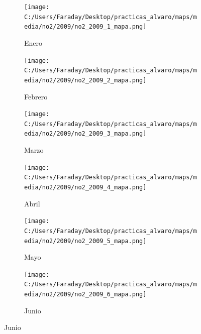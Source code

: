 \documentclass[12pt]{article}
\begin{document}
\begin{figure}[H]
\centering
\begin{subfigure}[H]{0.15\textwidth}
\texttt{[image: C:/Users/Faraday/Desktop/practicas\_alvaro/maps/media/no2/2009/no2\_2009\_1\_mapa.png]}
\captionsetup{labelformat=empty}
\caption{Enero}
\label{fig:map-no2-2009-1}
\end{subfigure}
%
\begin{subfigure}[H]{0.15\textwidth}
\texttt{[image: C:/Users/Faraday/Desktop/practicas\_alvaro/maps/media/no2/2009/no2\_2009\_2\_mapa.png]}
\captionsetup{labelformat=empty}
\caption{Febrero}
\label{fig:map-no2-2009-2}
\end{subfigure}
%
\begin{subfigure}[H]{0.15\textwidth}
\texttt{[image: C:/Users/Faraday/Desktop/practicas\_alvaro/maps/media/no2/2009/no2\_2009\_3\_mapa.png]}
\captionsetup{labelformat=empty}
\caption{Marzo}
\label{fig:map-no2-2009-3}
\end{subfigure}
%
\begin{subfigure}[H]{0.15\textwidth}
\texttt{[image: C:/Users/Faraday/Desktop/practicas\_alvaro/maps/media/no2/2009/no2\_2009\_4\_mapa.png]}
\captionsetup{labelformat=empty}
\caption{Abril}
\label{fig:map-no2-2009-4}
\end{subfigure}
%
\begin{subfigure}[H]{0.15\textwidth}
\texttt{[image: C:/Users/Faraday/Desktop/practicas\_alvaro/maps/media/no2/2009/no2\_2009\_5\_mapa.png]}
\captionsetup{labelformat=empty}
\caption{Mayo}
\label{fig:map-no2-2009-5}
\end{subfigure}
%
\begin{subfigure}[H]{0.15\textwidth}
\texttt{[image: C:/Users/Faraday/Desktop/practicas\_alvaro/maps/media/no2/2009/no2\_2009\_6\_mapa.png]}
\captionsetup{labelformat=empty}
\caption{Junio}
\label{fig:map-no2-2009-6}
\end{subfigure}


\end{figure}
\end{document}

